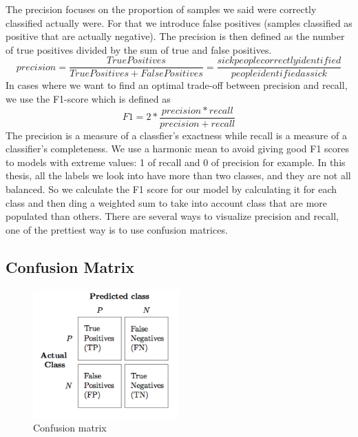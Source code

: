 The precision focuses on the proportion of samples we said were correctly classified actually were. For that we introduce false positives (samples classified as positive that are actually negative). The precision is then defined as the number of true positives divided by the sum of true and false positives.
\[precision = \frac{True Positives}{True Positives + False Positives} = \frac{sick people correctly identified}{people identified as sick}\]
 In cases where we want to find an optimal trade-off between precision and recall, we use the F1-score which is defined as 
 \[F1 = 2*\frac{precision * recall}{precision + recall} \]
 The precision is a measure of a classfier's exactness while recall is a measure of a classifier's completeness. 
 We use a harmonic mean to avoid giving good F1 scores to models with extreme values: 1 of recall and 0 of precision for example. 
 In this thesis, all the labels we look into have more than two classes, and they are not all balanced. So we calculate the F1 score for our model by calculating it for each class and then ding a weighted sum to take into account class that are more populated than others. 
There are several ways to visualize precision and recall, one of the prettiest way is to use confusion matrices. 
\subsection{Confusion Matrix}

\begin{figure}[h]
    \centering
        \includegraphics[width=0.5\textwidth]{./figures/02-CM}
        \caption{Confusion matrix}\label{fig:CM}
\end{figure}

